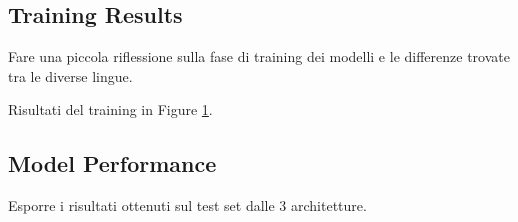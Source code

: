 \documentclass[letterpaper,11pt]{article}
\begin{document}
\subsection{Training Results}

Fare una piccola riflessione sulla fase di training dei modelli e le differenze trovate tra le diverse lingue.

Risultati del training in Figure \ref{figure:lstm_res}.

\subsection{Model Performance}

Esporre i risultati ottenuti sul test set dalle 3 architetture.


\newpage
\pagecolor{resblack}
\begin{figure}[H]
  \vspace*{-1.75cm}
  \caption{}
  \label{figure:lstm_res}
\end{figure}
\thispagestyle{empty}
\end{document}
